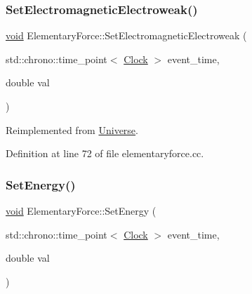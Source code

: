 \mbox{\label{class_elementary_force_af4f12038c33d7edf9f13339fcd632ec9}} 
\subsubsection{\texorpdfstring{Set\+Electromagnetic\+Electroweak()}{SetElectromagneticElectroweak()}}
{\footnotesize\ttfamily \mbox{\hyperlink{glad_8h_a950fc91edb4504f62f1c577bf4727c29}{void}} Elementary\+Force\+::\+Set\+Electromagnetic\+Electroweak (\begin{DoxyParamCaption}\item[{std\+::chrono\+::time\+\_\+point$<$ \mbox{\hyperlink{universe_8h_a0ef8d951d1ca5ab3cfaf7ab4c7a6fd80}{Clock}} $>$}]{event\+\_\+time,  }\item[{double}]{val }\end{DoxyParamCaption})\hspace{0.3cm}{\ttfamily [virtual]}}



Reimplemented from \mbox{\hyperlink{class_universe_a608aa95698380f791a0ffba45cc1bee3}{Universe}}.



Definition at line 72 of file elementaryforce.\+cc.

\mbox{\label{class_elementary_force_a466c84ee4a50a29ef1f0fc6509ae3161}} 
\subsubsection{\texorpdfstring{Set\+Energy()}{SetEnergy()}}
{\footnotesize\ttfamily \mbox{\hyperlink{glad_8h_a950fc91edb4504f62f1c577bf4727c29}{void}} Elementary\+Force\+::\+Set\+Energy (\begin{DoxyParamCaption}\item[{std\+::chrono\+::time\+\_\+point$<$ \mbox{\hyperlink{universe_8h_a0ef8d951d1ca5ab3cfaf7ab4c7a6fd80}{Clock}} $>$}]{event\+\_\+time,  }\item[{double}]{val }\end{DoxyParamCaption})}

